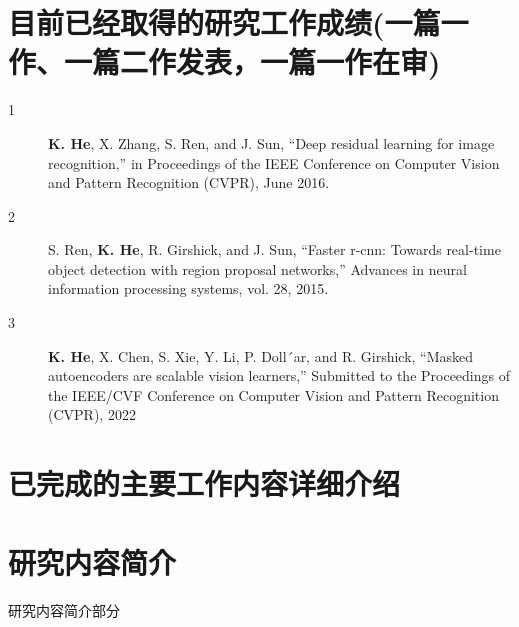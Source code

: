 
\section*{目前已经取得的研究工作成绩(一篇一作、一篇二作发表，一篇一作在审)}
\begin{description}
  \item[1] \textbf{K. He}, X. Zhang, S. Ren, and J. Sun, “Deep residual learning for image recognition,” in Proceedings of the IEEE Conference on Computer Vision and Pattern Recognition (CVPR), June 2016.
  \item[2] S. Ren, \textbf{K. He}, R. Girshick, and J. Sun, “Faster r-cnn: Towards real-time object detection with region proposal networks,” Advances in neural information processing systems,
vol. 28, 2015.
  \item[3] \textbf{K. He}, X. Chen, S. Xie, Y. Li, P. Doll´ar, and R. Girshick, “Masked autoencoders are scalable vision learners,” Submitted to the Proceedings of the IEEE/CVF Conference on Computer Vision and Pattern Recognition (CVPR), 2022
\end{description}

\section*{已完成的主要工作内容详细介绍}

\section{研究内容简介}
研究内容简介部分


%


\normalem %


%
%



